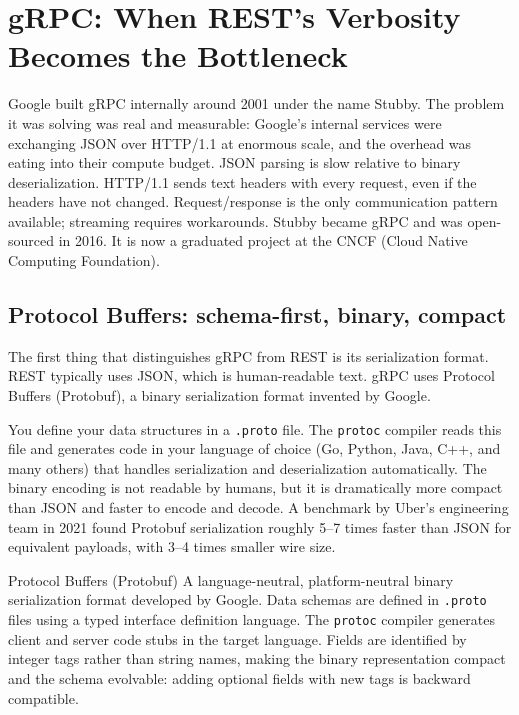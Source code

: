 \documentclass[11pt,a4paper]{article}
\begin{document}
\section{gRPC: When REST's Verbosity Becomes the Bottleneck}

Google built gRPC internally around 2001 under the name Stubby. The problem it was solving was real and measurable: Google's internal services were exchanging JSON over HTTP/1.1 at enormous scale, and the overhead was eating into their compute budget. JSON parsing is slow relative to binary deserialization. HTTP/1.1 sends text headers with every request, even if the headers have not changed. Request/response is the only communication pattern available; streaming requires workarounds. Stubby became gRPC and was open-sourced in 2016. It is now a graduated project at the CNCF (Cloud Native Computing Foundation).

\subsection{Protocol Buffers: schema-first, binary, compact}

The first thing that distinguishes gRPC from REST is its serialization format. REST typically uses JSON, which is human-readable text. gRPC uses Protocol Buffers (Protobuf), a binary serialization format invented by Google.

You define your data structures in a \texttt{.proto} file. The \texttt{protoc} compiler reads this file and generates code in your language of choice (Go, Python, Java, C++, and many others) that handles serialization and deserialization automatically. The binary encoding is not readable by humans, but it is dramatically more compact than JSON and faster to encode and decode. A benchmark by Uber's engineering team in 2021 found Protobuf serialization roughly 5--7 times faster than JSON for equivalent payloads, with 3--4 times smaller wire size.

\begin{termbox}{Protocol Buffers (Protobuf)}
A language-neutral, platform-neutral binary serialization format developed by Google. Data schemas are defined in \texttt{.proto} files using a typed interface definition language. The \texttt{protoc} compiler generates client and server code stubs in the target language. Fields are identified by integer tags rather than string names, making the binary representation compact and the schema evolvable: adding optional fields with new tags is backward compatible.
\end{termbox}
\end{document}
